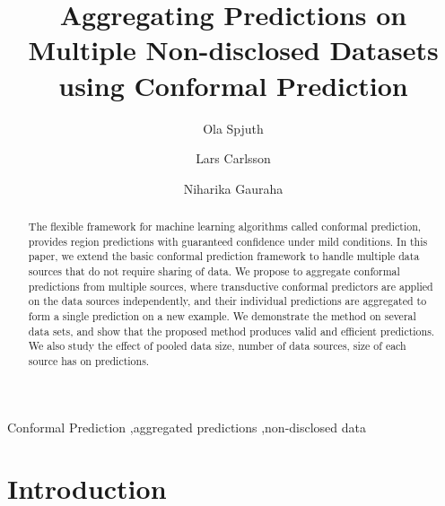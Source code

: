 \documentclass[main]{subfiles}
\begin{document}
\begin{frontmatter}

\title{Aggregating Predictions on Multiple Non-disclosed Datasets using Conformal Prediction}

\author[label1]{Ola Spjuth}
\author[label2]{Lars Carlsson}
\author[label1,label3]{Niharika Gauraha}


\address[label1]{Uppsala University}
\address[label2]{AstraZeneca}
\address[label3]{Indian Statistical Institute}

\begin{abstract}
The flexible framework for machine learning algorithms called conformal prediction, provides region predictions with guaranteed confidence under mild conditions. %
In this paper, we extend the basic conformal prediction framework to handle %
multiple data sources that do not require sharing of data.
We propose to aggregate conformal predictions from multiple sources, where transductive conformal predictors are applied on the data sources independently, and their individual predictions are aggregated to form a single prediction on a new example. We demonstrate the method on several data sets, and show that the proposed method produces valid and efficient predictions. We also study the effect of pooled data size, number of data sources, size of each source has on predictions.
\end{abstract}
\begin{keyword}


Conformal Prediction \sep aggregated predictions \sep non-disclosed data
\end{keyword}

\end{frontmatter}

\section{Introduction}
\end{document}
